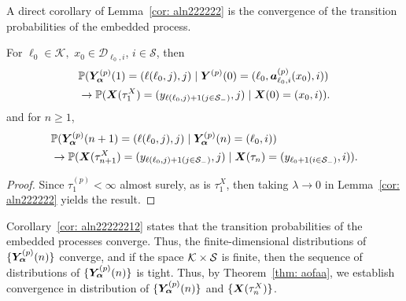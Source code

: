 A direct corollary of Lemma~\ref{cor: aln222222} is the convergence of the transition probabilities of the embedded process. 
\begin{cor}\label{cor: aln22222212} For \(\ell_0\in \mathcal K,\) \(x_0\in\mathcal D_{\ell_0,i}\), \(i\in\mathcal S\), 
		then
		\begin{align}
			&\mathbb P(\bm{Y}_{\bm{\alpha}}^{(p)}(1) = (\ell(\ell_0,j),j)
					 \mid \boldsymbol Y^{(p)}(0) = (\ell_0,\boldsymbol a_{\ell_0,i}^{(p)}(x_0),i)) \nonumber
			\\&\to  
				\mathbb P(\boldsymbol X(\tau_1^X) = (y_{\ell(\ell_0,j)+1(j\in\mathcal{S}_-)}, j)  \mid \boldsymbol X(0) = (x_0,i)).\label{eqn: lim 2}
		\end{align}
		and for \(n\geq 1\),  
		\begin{align}
			&\mathbb P(\bm{Y}_{\bm{\alpha}}^{(p)}(n+1) = (\ell(\ell_0,j),j) 
					 \mid \bm{Y}_{\bm{\alpha}}^{(p)}(n) = (\ell_0,i) ) \nonumber
			\\&\to  
				\mathbb P(\boldsymbol X(\tau_{n+1}^X) = (y_{\ell(\ell_0,j)+1(j\in\mathcal{S}_-)}, j) \mid \boldsymbol X(\tau_{n}) = (y_{\ell_0+1(i\in\mathcal{S}_-)},i) ).\label{eqn: ddddddd2}
		\end{align}
\end{cor}
\begin{proof}
	Since \(\tau_1^{(p)}<\infty\) almost surely, as is \(\tau_1^X\), then taking \(\lambda \to 0\) in Lemma~\ref{cor: aln222222} yields the result. 
\end{proof}
Corollary~\ref{cor: aln22222212} states that the transition probabilities of the embedded processes converge. Thus, the finite-dimensional distributions of \(\{\bm{Y}_{\bm{\alpha}}^{(p)}(n)\}\) converge, and if the space \(\mathcal K\times \mathcal{S}\) is finite, then the sequence of distributions of \(\{\bm{Y}_{\bm{\alpha}}^{(p)}(n)\}\) is tight. Thus, by Theorem~\ref{thm: aofaa}, we establish convergence in distribution of \(\{\bm{Y}_{\bm{\alpha}}^{(p)}(n)\}\) and \(\{\boldsymbol X(\tau_n^X)\}\). 

